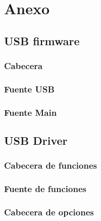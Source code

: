 \chapter{Anexo} %




\section{USB firmware}
\subsection{Cabecera}


\subsection{Fuente USB}


\subsection{Fuente Main}


\section{USB Driver}
\subsection{Cabecera de funciones}


\subsection{Fuente de funciones}


\subsection{Cabecera de opciones}


